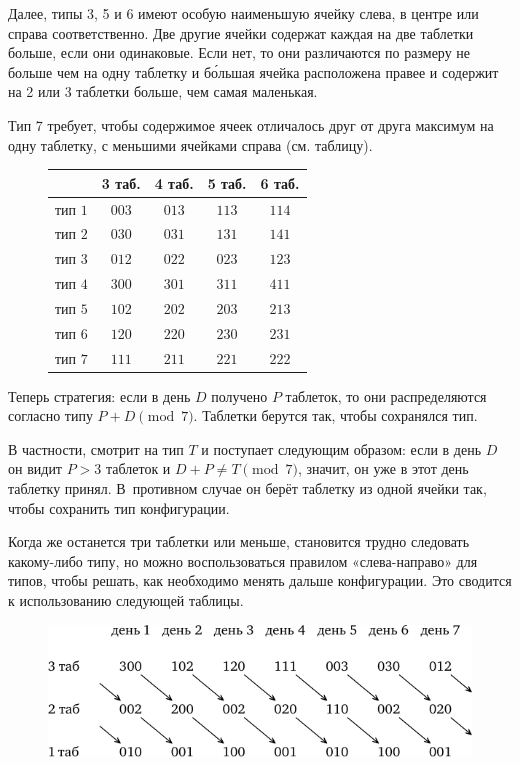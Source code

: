 \documentclass[twoside]{book}
\begin{document}
Далее, типы 3, 5 и 6 имеют особую наименьшую ячейку слева, в центре или справа соответственно.
Две другие ячейки содержат каждая на две таблетки больше, если они одинаковые.
Если нет, то они различаются по размеру не больше чем на одну таблетку и б\'{о}льшая ячейка расположена правее и содержит на 2 или 3 таблетки больше, чем самая маленькая.

Тип 7 требует, чтобы содержимое ячеек отличалось друг от друга максимум на одну таблетку, с меньшими ячейками справа (см. таблицу).

\begin{figure}[!ht]
\centering
\begin{tabular}{ l  c c c c }
  \toprule
     & 3 таб. & 4 таб. & 5 таб. & 6 таб. \\ \midrule
    тип $1$ & $003$ & $013$ & $113$ & $114$ \\ 
    тип $2$ & $030$ & $031$ & $131$ & $141$ \\ 
    тип $3$ & $012$ & $022$ & $023$ & $123$\\ 
    тип $4$ & $300$ & $301$ & $311$ & $411$\\ 
    тип $5$ & $102$ & $202$ & $203$ & $213$\\ 
    тип $6$ & $120$ & $220$ & $230$ & $231$\\ 
  тип $7$ & $111$ & $211$ & $221$ & $222$ \\
                            \bottomrule
  \end{tabular}
\end{figure}

Теперь стратегия: если в день $D$ получено $P$ таблеток, то они распределяются согласно типу $P+D \pmod 7$.
Таблетки берутся так, чтобы сохранялся тип.

В частности,  смотрит на тип $T$ и поступает следующим образом:
если в день $D$ он видит $P>3$ таблеток и $D+P\ne T\pmod 7$, значит, он уже в этот день таблетку принял.
В~противном случае он берёт таблетку из одной ячейки так, чтобы сохранить тип конфигурации.

Когда же останется три таблетки или меньше, становится трудно следовать какому-либо типу, но можно воспользоваться правилом «слева-направо» для типов, чтобы решать, как необходимо менять дальше конфигурации.
Это сводится к использованию следующей таблицы.

\begin{figure}[!ht]
\centering
\includegraphics{mp/wink-26}
\end{figure}
\end{document}

